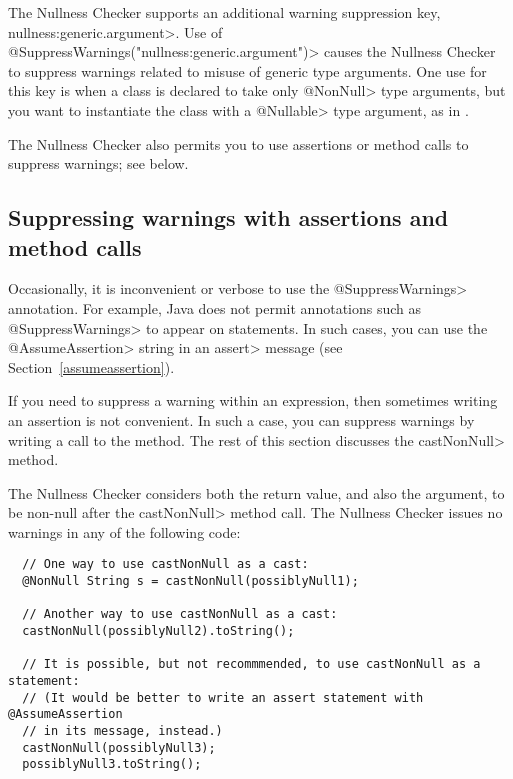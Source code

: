 The Nullness Checker supports an additional warning suppression key,
\<nullness:generic.argument>.
Use of \<@SuppressWarnings("nullness:generic.argument")> causes the Nullness
Checker to suppress warnings related to misuse of generic type
arguments.  One use for this key is when a class is declared to take only
\<@NonNull> type arguments, but you want to instantiate the class with a
\<@Nullable> type argument, as in .

The Nullness Checker also permits you to use assertions or method calls to
suppress warnings; see below.



\subsection{Suppressing warnings with assertions and method calls\label{suppressing-warnings-with-assertions}}

Occasionally, it is inconvenient or
verbose to use the \<@SuppressWarnings> annotation.  For example, Java does
not permit annotations such as \<@SuppressWarnings> to appear on statements.
In such cases, you can use the \<@AssumeAssertion> string in
an \<assert> message (see Section~\ref{assumeassertion}).

If you need to suppress a warning within an expression, then
sometimes writing an assertion is not convenient.  In such a case,
you can suppress warnings by writing a call to the
 method.
The rest of this section discusses the \<castNonNull> method.

The Nullness Checker considers both the return value, and also the
argument, to be non-null after the \<castNonNull> method call.
The Nullness Checker issues no warnings in any of the following
code:

\begin{Verbatim}
  // One way to use castNonNull as a cast:
  @NonNull String s = castNonNull(possiblyNull1);

  // Another way to use castNonNull as a cast:
  castNonNull(possiblyNull2).toString();

  // It is possible, but not recommmended, to use castNonNull as a statement:
  // (It would be better to write an assert statement with @AssumeAssertion
  // in its message, instead.)
  castNonNull(possiblyNull3);
  possiblyNull3.toString();
\end{Verbatim}

